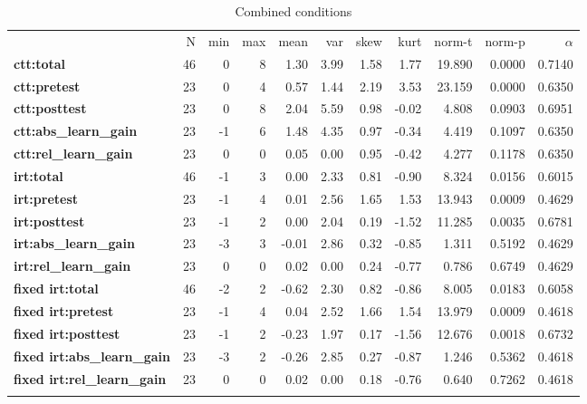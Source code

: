 \begin{longtable}[c]{@{}lrrrrrrrrrr@{}}
\caption{Combined conditions}
\endfirsthead
\endhead
\toprule\addlinespace
& N & min & max & mean & var & skew & kurt & norm-t &
norm-p & $\alpha$
\\\addlinespace
\midrule
\textbf{ctt:total} & 46 & 0 & 8 & 1.30 & 3.99 & 1.58 & 1.77 & 19.890 &
0.0000 & 0.7140
\\\addlinespace
\textbf{ctt:pretest} & 23 & 0 & 4 & 0.57 & 1.44 & 2.19 & 3.53 & 23.159 &
0.0000 & 0.6350
\\\addlinespace
\textbf{ctt:posttest} & 23 & 0 & 8 & 2.04 & 5.59 & 0.98 & -0.02 & 4.808
& 0.0903 & 0.6951
\\\addlinespace
\textbf{ctt:abs\_learn\_gain} & 23 & -1 & 6 & 1.48 & 4.35 & 0.97 & -0.34
& 4.419 & 0.1097 & 0.6350
\\\addlinespace
\textbf{ctt:rel\_learn\_gain} & 23 & 0 & 0 & 0.05 & 0.00 & 0.95 & -0.42
& 4.277 & 0.1178 & 0.6350
\\\addlinespace
\textbf{irt:total} & 46 & -1 & 3 & 0.00 & 2.33 & 0.81 & -0.90 & 8.324 &
0.0156 & 0.6015
\\\addlinespace
\textbf{irt:pretest} & 23 & -1 & 4 & 0.01 & 2.56 & 1.65 & 1.53 & 13.943
& 0.0009 & 0.4629
\\\addlinespace
\textbf{irt:posttest} & 23 & -1 & 2 & 0.00 & 2.04 & 0.19 & -1.52 &
11.285 & 0.0035 & 0.6781
\\\addlinespace
\textbf{irt:abs\_learn\_gain} & 23 & -3 & 3 & -0.01 & 2.86 & 0.32 &
-0.85 & 1.311 & 0.5192 & 0.4629
\\\addlinespace
\textbf{irt:rel\_learn\_gain} & 23 & 0 & 0 & 0.02 & 0.00 & 0.24 & -0.77
& 0.786 & 0.6749 & 0.4629
\\\addlinespace
\textbf{fixed irt:total} & 46 & -2 & 2 & -0.62 & 2.30 & 0.82 & -0.86
& 8.005 & 0.0183 & 0.6058
\\\addlinespace
\textbf{fixed irt:pretest} & 23 & -1 & 4 & 0.04 & 2.52 & 1.66 & 1.54
& 13.979 & 0.0009 & 0.4618
\\\addlinespace
\textbf{fixed irt:posttest} & 23 & -1 & 2 & -0.23 & 1.97 & 0.17 &
-1.56 & 12.676 & 0.0018 & 0.6732
\\\addlinespace
\textbf{fixed irt:abs\_learn\_gain} & 23 & -3 & 2 & -0.26 & 2.85 &
0.27 & -0.87 & 1.246 & 0.5362 & 0.4618
\\\addlinespace
\textbf{fixed irt:rel\_learn\_gain} & 23 & 0 & 0 & 0.02 & 0.00 & 0.18
& -0.76 & 0.640 & 0.7262 & 0.4618
\\\addlinespace
\bottomrule
    \label{tab:comp_gen}
\end{longtable}

